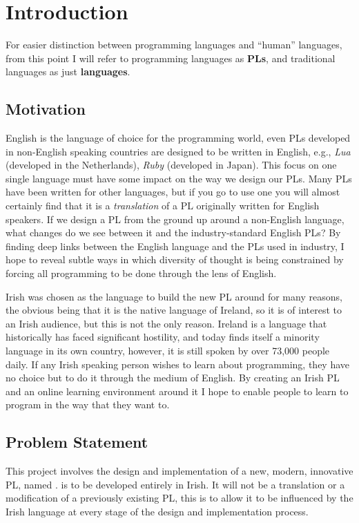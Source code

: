 \chapter{Introduction}
For easier distinction between programming languages and ``human'' languages, from this point I will refer to programming languages as \textbf{PLs}, and traditional languages as just \textbf{languages}.

\section{Motivation}
English is the language of choice for the programming world, even PLs developed in non-English speaking countries are designed to be written in English, e.g., \emph{Lua} (developed in the Netherlands), \emph{Ruby} (developed in Japan).
This focus on one single language must have some impact on the way we design our PLs.
Many PLs have been written for other languages, but if you go to use one you will almost certainly find that it is a \emph{translation} of a PL originally written for English speakers\cite{wikipllist}.
If we design a PL from the ground up around a non-English language, what changes do we see between it and the industry-standard English PLs? By finding deep links between the English language and the PLs used in industry, I hope to reveal subtle ways in which diversity of thought is being constrained by forcing all programming to be done through the lens of English.

Irish was chosen as the language to build the new PL around for many reasons, the obvious being that it is the native language of Ireland, so it is of interest to an Irish audience, but this is not the only reason.
Ireland is a language that historically has faced significant hostility, and today finds itself a minority language in its own country, however, it is still spoken by over 73,000 people daily\cite{csoirish}.
If any Irish speaking person wishes to learn about programming, they have no choice but to do it through the medium of English.
By creating an Irish PL and an online learning environment around it I hope to enable people to learn to program in the way that they want to.

\section{Problem Statement}
This project involves the design and implementation of a new, modern, innovative PL, named \Setanta{}.
\Setanta{} is to be developed entirely in Irish.
It will not be a translation or a modification of a previously existing PL, this is to allow it to be influenced by the Irish language at every stage of the design and implementation process.

